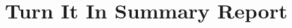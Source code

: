 %
%
%                 

\chapter{Turn It In Summary Report}
\label{sec:appendixb}



 



%
%
%
%

%
%


